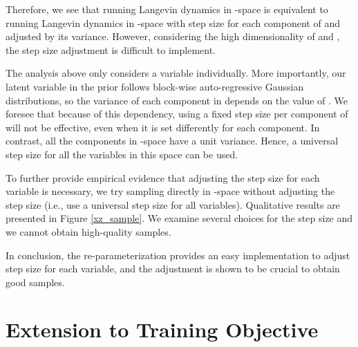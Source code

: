 \documentclass{article} \usepackage{iclr2021_conference,times}
\begin{document}
Therefore, we see that running Langevin dynamics in -space is equivalent to running Langevin dynamics in -space with step size for each component of  and  adjusted by its variance. However, considering the high dimensionality of  and , the step size adjustment is difficult to implement. 

The analysis above only considers a variable individually. More importantly, our latent variable  in the prior follows block-wise auto-regressive Gaussian distributions, so the variance of each component in  depends on the value of . We foresee that because of this dependency, using a fixed step size per component of  will not be effective, even when it is set differently for each component. In contrast, all the components in -space have a unit variance. Hence, a universal step size for all the variables in this space can be used.

To further provide empirical evidence that adjusting the step size for each variable is necessary, we try sampling directly in -space without adjusting the step size (i.e., use a universal step size for all variables). Qualitative results are presented in Figure \ref{xz_sample}. We examine several choices for the step size and we cannot obtain high-quality samples. 


In conclusion, the re-parameterization provides an easy implementation to adjust step size for each variable, and the adjustment is shown to be crucial to obtain good samples.

\section{Extension to Training Objective}\label{gan loss}
\end{document}
